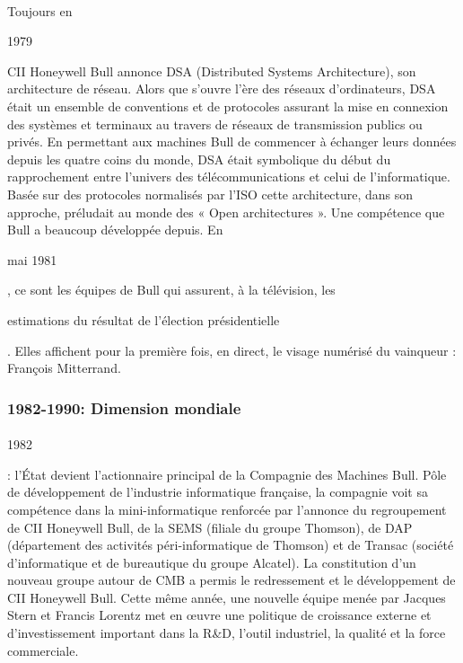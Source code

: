 \documentclass{article}
\begin{document}
		\paragraph{}
		Toujours en \begin{bf}1979\end{bf} CII Honeywell Bull annonce DSA (Distributed Systems Architecture), son 
		architecture de réseau. Alors que s’ouvre l’ère des réseaux d’ordinateurs, DSA était un ensemble de conventions et de 
		protocoles assurant la mise en connexion des systèmes et terminaux au travers de réseaux de transmission publics ou 
		privés. En permettant aux machines Bull de commencer à échanger leurs données depuis les quatre coins du monde, DSA 
		était symbolique du début du rapprochement entre l’univers des télécommunications et celui de l’informatique. Basée 
		sur des protocoles normalisés par l’ISO cette architecture, dans son approche, préludait au monde des « Open 
		architectures ». Une compétence que Bull a beaucoup développée depuis.\newline{}
		En \begin{bf}mai 1981\end{bf}, ce sont les équipes de Bull qui assurent, à la télévision, les \begin{bf}estimations 
		du résultat de l’élection présidentielle\end{bf}. Elles affichent pour la première fois, en direct, le visage numérisé du 
		vainqueur : François Mitterrand.
		\subsubsection{1982-1990: Dimension mondiale}
		\paragraph{}
		\begin{bf}1982\end{bf}: l’État devient l’actionnaire principal de la Compagnie des Machines Bull. Pôle de 
		développement de l’industrie informatique française, la compagnie voit sa compétence dans la mini-informatique 
		renforcée par l’annonce du regroupement de CII Honeywell Bull, de la SEMS (filiale du groupe Thomson), de DAP 
		(département des activités péri-informatique de Thomson) et de Transac (société d’informatique et de bureautique du 
		groupe Alcatel). La constitution d’un nouveau groupe autour de CMB a permis le redressement et le développement de CII 
		Honeywell Bull.\newline{}
		Cette même année, une nouvelle équipe menée par Jacques Stern et Francis Lorentz met en œuvre une politique de 
		croissance externe et d’investissement important dans la R\&D, l’outil industriel, la qualité et la force commerciale.
\end{document}
